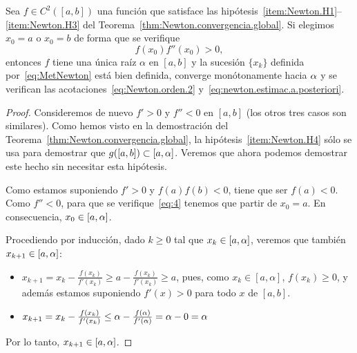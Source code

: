 \begin{corollary}
  Sea $f \in C^2([a,b])$ una función que satisface las
  hipótesis~\ref{item:Newton.H1}--\ref{item:Newton.H3} del
  Teorema~\ref{thm:Newton.convergencia.global}. Si elegimos $x_0=a$
  o $x_0=b$ de forma que se verifique
  \begin{equation}
    \label{eq:4}
    f(x_0) f''(x_0) > 0,
  \end{equation}
  entonces $f$ tiene una única raíz $\alpha$ en $[a,b]$ y la
  sucesión $\{x_k\}$ definida por~\eqref{eq:MetNewton} está bien
  definida, converge monótonamente hacia $\alpha$ y se verifican las
  acotaciones~\eqref{eq:Newton.orden.2}
  y~\eqref{eq:newton.estimac.a.posteriori}.
  \label{cor:regla.fourier}
\end{corollary}
\begin{proof}
  Consideremos de nuevo $f'>0$ y $f''<0$ en $[a,b]$ (los otros tres
  casos son similares). Como hemos visto en la demostración del
  Teorema~\ref{thm:Newton.convergencia.global}, la
  hipótesis~\ref{item:Newton.H4} sólo se usa para demostrar que
  $g([a,b])\subset [a,\alpha]$. Veremos que ahora podemos demostrar
  este hecho sin necesitar esta hipótesis.

  Como estamos suponiendo $f'>0$ y $f(a)f(b)<0$, tiene que ser
    $f(a)<0$.
  Como $f''<0$, para que se verifique~\eqref{eq:4} tenemos que partir
  de $x_0=a$. En consecuencia, $x_0\in[a,\alpha]$.

  Procediendo por inducción, dado $k\ge 0$ tal que $x_k\in [a,\alpha]$, veremos que
  también $x_{k+1}\in [a,\alpha]$:
  \begin{itemize}
  \item
    $x_{k+1}=x_k-\frac{f(x_k)}{f'(x_k)} \ge a - \frac{f(x_k)}{f'(x_k)}
    \ge a$,
    pues, como $x_k\in [a,\alpha]$, $f(x_k)\ge 0$, y además estamos
    suponiendo $f'(x)>0$ para todo $x$ de $[a,b]$.
  \item
    $x_{k+1}=x_k-\frac{f(x_k)}{f'(x_k)} \le
    \alpha-\frac{f(\alpha)}{f'(\alpha)}=\alpha-0 =\alpha$
  \end{itemize}
  Por lo tanto,  $x_{k+1}\in [a,\alpha]$.

\end{proof}

